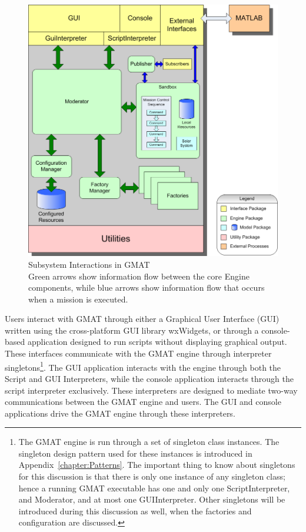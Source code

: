 \begin{figure}
\begin{center}
\includegraphics[445,449]{Images/GMAT_Stack.png}
\caption[Subsystem Interactions in GMAT]{\label{figure:GMATStackDiagram}Subsystem Interactions in
GMAT\\Green arrows show information flow between the core Engine components, while blue arrows show
information flow that occurs when a mission is executed.}
\end{center}
\end{figure}

Users interact with GMAT through either a Graphical User Interface (GUI) written using the
cross-platform GUI library wxWidgets, or through a console-based application designed to
run scripts without displaying graphical output.  These interfaces communicate with the GMAT engine
through interpreter singletons\footnote{The GMAT
engine is run through a set of singleton class instances.  The singleton design pattern used for
these instances is introduced in Appendix~\ref{chapter:Patterns}.  The important thing to know about
singletons for this discussion is that there is only one instance of any singleton class; hence a
running GMAT executable has one and only one ScriptInterpreter, and Moderator, and at most one
GUIInterpreter.  Other singletons will be introduced during this discussion as well, when the
factories and configuration are discussed.}.  The GUI application interacts with the engine through
both the Script and GUI Interpreters, while the console application interacts through the script
interpreter exclusively.  These interpreters are designed to mediate two-way communications between
the GMAT engine and users.   The GUI and console applications drive the GMAT engine through these
interpreters.

